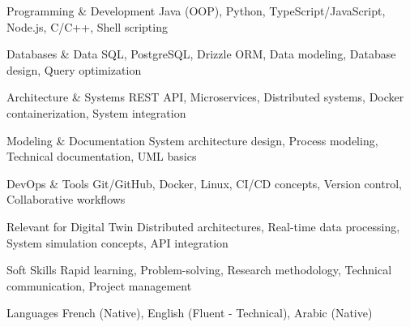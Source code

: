 
\begin{cvskills}

    \cvskill
    {Programming \& Development} %
    {Java (OOP), Python, TypeScript/JavaScript, Node.js, C/C++, Shell scripting} %

    \cvskill
    {Databases \& Data} %
    {SQL, PostgreSQL, Drizzle ORM, Data modeling, Database design, Query optimization} %

    \cvskill
    {Architecture \& Systems} %
    {REST API, Microservices, Distributed systems, Docker containerization, System integration} %

    \cvskill
    {Modeling \& Documentation} %
    {System architecture design, Process modeling, Technical documentation, UML basics} %

    \cvskill
    {DevOps \& Tools} %
    {Git/GitHub, Docker, Linux, CI/CD concepts, Version control, Collaborative workflows} %

    \cvskill
    {Relevant for Digital Twin} %
    {Distributed architectures, Real-time data processing, System simulation concepts, API integration} %

    \cvskill
    {Soft Skills} %
    {Rapid learning, Problem-solving, Research methodology, Technical communication, Project management} %

    \cvskill
    {Languages} %
    {French (Native), English (Fluent - Technical), Arabic (Native)} %

\end{cvskills}
